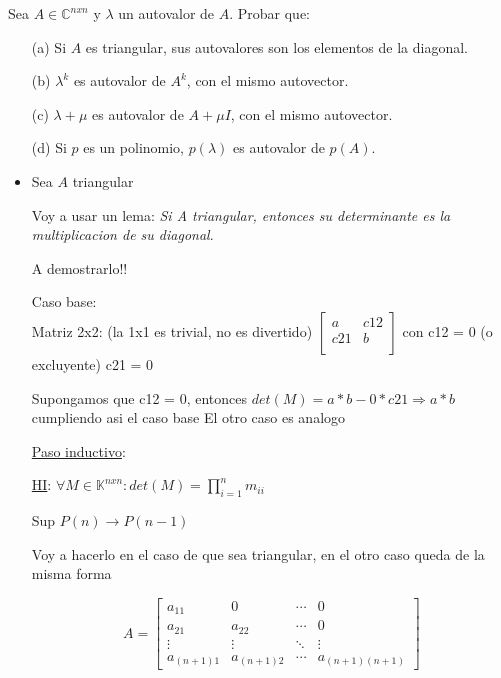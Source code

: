 \begin{enunciado}{\ejercicio}
Sea $A \in \mathbb{C}^{nxn}$ y $\lambda$ un autovalor de $A$. Probar que:
\begin{itemize}
    \item[(a)] Si $A$ es triangular, sus autovalores son los elementos de la diagonal.
    \item[(b)] $\lambda^k$ es autovalor de $A^k$, con el mismo autovector.
    \item[(c)] $\lambda + \mu$ es autovalor de $A + \mu I$, con el mismo autovector.
    \item[(d)] Si $p$ es un polinomio, $p(\lambda)$ es autovalor de $p(A)$.
\end{itemize}
\end{enunciado}

\begin{itemize}
    \item 
    Sea $A$ triangular

    Voy a usar un lema: \textit{Si A triangular, entonces su determinante es la multiplicacion de su diagonal}.

    A demostrarlo!!

    Caso base: \\
        Matriz 2x2: (la 1x1 es trivial, no es divertido)
        $
        \begin{bmatrix}
            a & c12 \\
            c21 & b  \\
            \end{bmatrix}
            $
        con c12 = 0 (o excluyente) c21 = 0

        Supongamos que c12 = 0, entonces $det(M) = a * b - 0 * c21 \Rightarrow a*b$ cumpliendo asi el caso base
        El otro caso es analogo
    
    \underline{Paso inductivo}:

        \underline{HI}: $\forall M \in \mathbb{K}^{nxn}: det(M) = \prod_{i=1}^{n}m_{ii}$

        Sup $P(n) \rightarrow P(n-1)$

        Voy a hacerlo en el caso de que sea triangular, en el otro caso queda de la misma forma

        \[
        A = \begin{bmatrix}
            a_{11} & 0 & \cdots & 0 \\
            a_{21} & a_{22} & \cdots & 0  \\
            \vdots & \vdots & \ddots & \vdots \\
            a_{(n+1)1} & a_{(n+1)2} & \cdots & a_{(n+1)(n+1)}
        \end{bmatrix}
            \]


\end{itemize}
